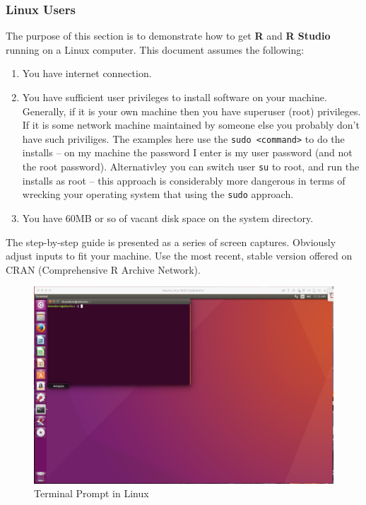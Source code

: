 \clearpage
\subsubsection{Linux Users}
The purpose of this section is to demonstrate how to get \textbf{R} and \textbf{R Studio}  running on a Linux computer.  
This document assumes the following:
\begin{enumerate}
\item You have internet connection.
\item You have sufficient user privileges to install software on your machine.  
Generally, if it is your own machine then you have superuser (root) privileges.
If it is some network machine maintained by someone else you probably don't have such priviliges.
The examples here use the \texttt{sudo <command>} to do the installs -- on my machine the password I enter is my user password (and not the root password).  
Alternativley you can switch user \texttt{su} to root, and run the installs as root -- this approach is considerably more dangerous in terms of wrecking your operating system that using the \texttt{sudo} approach.
\item You have 60MB or so of vacant disk space on the system directory.
\end{enumerate}

The step-by-step guide is presented as a series of screen captures.  Obviously adjust inputs to fit your machine.  
Use the most recent, stable version offered on CRAN (Comprehensive R Archive Network).

\begin{figure}[h!] %
   \centering
   \includegraphics[width=5in]{./1-Introduction/LinuxTerminalPrompt.pdf} 
   \caption{Terminal Prompt in Linux}
\end{figure}

